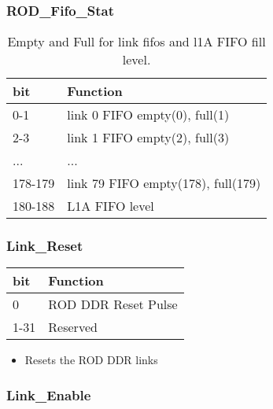 \subsubsection{ROD\_Fifo\_Stat}
\begin {table}[H]
\begin{center}
\begin{tabular}{|l|l|}
\hline
\textbf{bit} & \textbf{Function} \\
\hline
0-1 & link 0 FIFO empty(0), full(1) \\ \hline
2-3 & link 1 FIFO empty(2), full(3) \\ \hline
... & ...\\ \hline
178-179 & link 79 FIFO empty(178), full(179)\\ \hline
180-188 & L1A FIFO level\\ \hline
\end{tabular}
\caption{Empty and Full for link fifos and l1A FIFO fill level.}
\end{center}
\end{table}



\subsubsection{Link\_Reset}

\begin {table}[H]
\begin{center}
\begin{tabular}{|l|l|}
\hline
\textbf{bit} & \textbf{Function} \\
\hline
0 & ROD DDR Reset Pulse \\
\hline
1-31 & Reserved \\
\hline
\end{tabular}
\end{center}
\end{table}


\begin{itemize}
\item Resets the ROD DDR links
\end{itemize}




\subsubsection{Link\_Enable}

